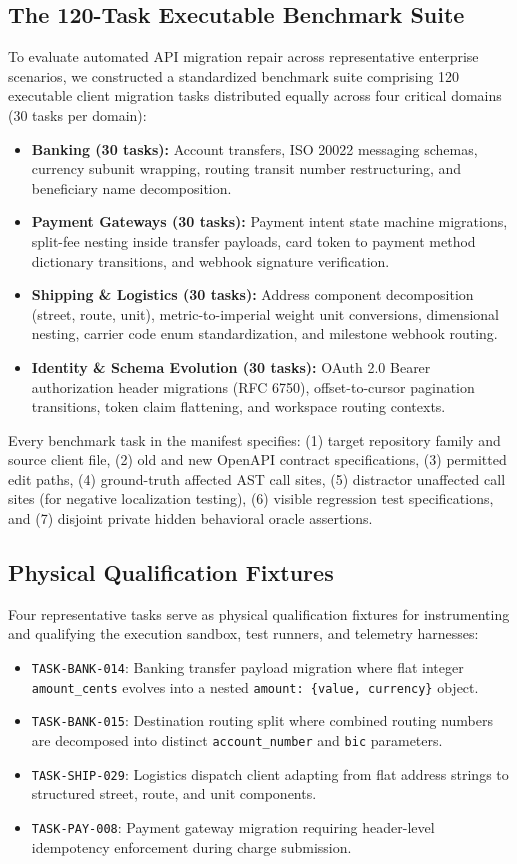 \subsection{The 120-Task Executable Benchmark Suite}
To evaluate automated API migration repair across representative enterprise scenarios, we constructed a standardized benchmark suite comprising 120 executable client migration tasks distributed equally across four critical domains (30 tasks per domain):
\begin{itemize}
    \item \textbf{Banking (30 tasks):} Account transfers, ISO 20022 messaging schemas, currency subunit wrapping, routing transit number restructuring, and beneficiary name decomposition.
    \item \textbf{Payment Gateways (30 tasks):} Payment intent state machine migrations, split-fee nesting inside transfer payloads, card token to payment method dictionary transitions, and webhook signature verification.
    \item \textbf{Shipping \& Logistics (30 tasks):} Address component decomposition (street, route, unit), metric-to-imperial weight unit conversions, dimensional nesting, carrier code enum standardization, and milestone webhook routing.
    \item \textbf{Identity \& Schema Evolution (30 tasks):} OAuth 2.0 Bearer authorization header migrations (RFC 6750), offset-to-cursor pagination transitions, token claim flattening, and workspace routing contexts.
\end{itemize}

Every benchmark task in the manifest specifies: (1) target repository family and source client file, (2) old and new OpenAPI contract specifications, (3) permitted edit paths, (4) ground-truth affected AST call sites, (5) distractor unaffected call sites (for negative localization testing), (6) visible regression test specifications, and (7) disjoint private hidden behavioral oracle assertions.

\subsection{Physical Qualification Fixtures}
Four representative tasks serve as physical qualification fixtures for instrumenting and qualifying the execution sandbox, test runners, and telemetry harnesses:
\begin{itemize}
    \item \texttt{TASK-BANK-014}: Banking transfer payload migration where flat integer \texttt{amount\_cents} evolves into a nested \texttt{amount: \{value, currency\}} object.
    \item \texttt{TASK-BANK-015}: Destination routing split where combined routing numbers are decomposed into distinct \texttt{account\_number} and \texttt{bic} parameters.
    \item \texttt{TASK-SHIP-029}: Logistics dispatch client adapting from flat address strings to structured street, route, and unit components.
    \item \texttt{TASK-PAY-008}: Payment gateway migration requiring header-level idempotency enforcement during charge submission.
\end{itemize}

